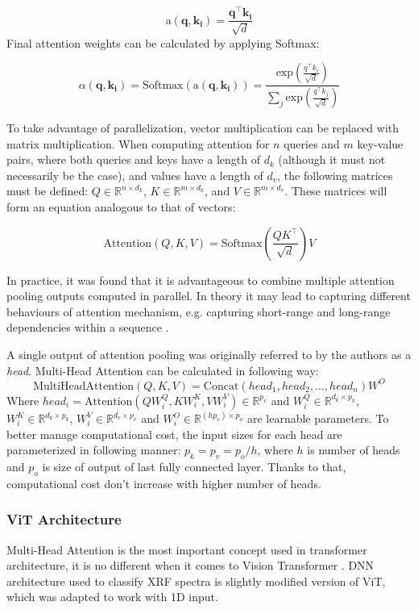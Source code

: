 \[\text{a}(\mathbf{q}, {\mathbf{k_i}}) = \frac{\mathbf{q}^\intercal \mathbf{k_i}}{\sqrt{d}}\]
Final attention weights can be calculated by applying Softmax: 

\[\alpha(\mathbf{q}, \mathbf{k_i}) = \text{Softmax}(\text{a}(\mathbf{q}, \mathbf{k_i})) =\frac{\text{exp}(\frac{q^\intercal k_i}{\sqrt{d}})}{\sum_j \text{exp}(\frac{q^\intercal k_j}{\sqrt{d}})} \]

To take advantage of parallelization, vector multiplication can be replaced with matrix multiplication. When computing attention for $n$ queries and $m$ key-value pairs, where both queries and keys have a length of $d_k$ (although it must not necessarily be the case), and values have a length of $d_v$, the following matrices must be defined: $Q \in \mathbb{R}^{n \times d_k}$, $K \in \mathbb{R}^{m \times d_k}$, and $V \in \mathbb{R}^{m \times d_v}$. These matrices will form an equation analogous to that of vectors:

\[\text{Attention}(Q, K, V) = \text{Softmax}(\frac{Q K^\intercal}{\sqrt{d}})V \]

In practice, it was found that it is advantageous to combine multiple attention pooling outputs computed in parallel. 
In theory it may lead to capturing different behaviours of attention mechanism, e.g. capturing short-range and long-range dependencies within a sequence \cite{d2lMultiHeadAttention}.


A single output of attention pooling was originally referred to by the authors as a \emph{head}. 
Multi-Head Attention can be calculated in following way: 
\[\text{MultiHeadAttention}(Q, K, V)  = \text{Concat}(head_1, head_2, \dots, head_n)W^O\]
Where $head_i = \text{Attention}(QW_i^Q, KW_i^K, VW_i^V) \in \mathbb{R}^{p_v}$  and $W_i^Q \in \mathbb{R}^{d_k \times p_k}$, $W_i^K \in \mathbb{R}^{d_k \times p_k}$, $W_i^V \in \mathbb{R}^{d_v \times p_v}$ and $W_i^O \in \mathbb{R}^{(hp_v) \times p_o}$ are learnable parameters.
To better manage computational cost, the input sizes for each head are parameterized in following manner: $p_k = p_v = p_o / h$, where $h$ is number of heads and $p_o$ is size of output of last fully connected layer. Thanks to that, computational cost don't increase with higher number of heads.

\subsubsection{ViT Architecture}
Multi-Head Attention is the most important concept used in transformer architecture, it is no different when it comes to Vision Transformer \cite{vitPaper}.
DNN architecture used to classify XRF spectra is slightly modified version of ViT, which was adapted to work with 1D input.

